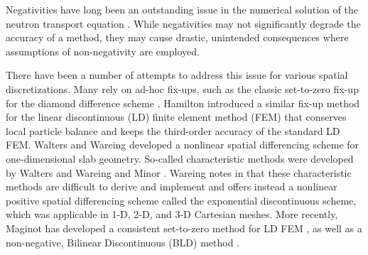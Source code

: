 Negativities have long been an outstanding issue in the numerical solution
of the neutron transport equation \cite{lanthrop}. While negativities
may not significantly degrade the accuracy of a method, they may cause
drastic, unintended consequences where assumptions of non-negativity
are employed.

There have been a number of attempts to address this issue for various
spatial discretizations. Many rely on ad-hoc fix-ups, such as the classic
set-to-zero fix-up for the diamond difference scheme \cite{lewis}.
Hamilton \cite{hamilton} introduced a similar fix-up method for the
linear discontinuous (LD) finite element method (FEM) that conserves local
particle balance and keeps the third-order accuracy of the standard
LD FEM. Walters and Wareing \cite{walters} developed a nonlinear
spatial differencing scheme for one-dimensional slab geometry.
So-called characteristic methods were developed by Walters and Wareing
\cite{walters_NC} and Minor \cite{minor}.
Wareing notes in \cite{wareing} that these characteristic methods
are difficult to derive and implement and offers instead
a nonlinear positive spatial differencing scheme called
the exponential discontinuous scheme, which was applicable in 1-D,
2-D, and 3-D Cartesian meshes. More recently, Maginot has
developed a consistent set-to-zero method for LD FEM \cite{maginot},
as well as a non-negative, Bilinear Discontinuous (BLD) method
\cite{maginot_mc2015}.

